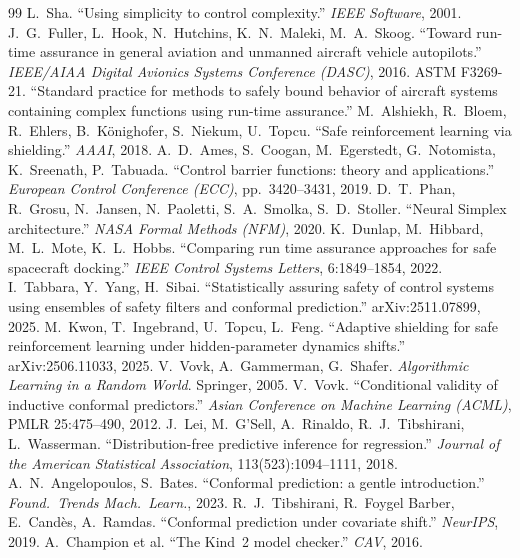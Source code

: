 \documentclass[journal]{IEEEtran}
\theoremstyle{plain}
\theoremstyle{definition}
\begin{document}
\begin{thebibliography}{99}\small
{} L.~Sha. ``Using simplicity to control complexity.'' \emph{IEEE Software}, 2001.
 J.~G.~Fuller, L.~Hook, N.~Hutchins, K.~N.~Maleki, M.~A.~Skoog. ``Toward run-time assurance in general aviation and unmanned aircraft vehicle autopilots.'' \emph{IEEE/AIAA Digital Avionics Systems Conference (DASC)}, 2016.
 ASTM F3269-21. ``Standard practice for methods to safely bound behavior of aircraft systems containing complex functions using run-time assurance.''
 M.~Alshiekh, R.~Bloem, R.~Ehlers, B.~K\"onighofer, S.~Niekum, U.~Topcu. ``Safe reinforcement learning via shielding.'' \emph{AAAI}, 2018.
 A.~D.~Ames, S.~Coogan, M.~Egerstedt, G.~Notomista, K.~Sreenath, P.~Tabuada. ``Control barrier functions: theory and applications.'' \emph{European Control Conference (ECC)}, pp.\ 3420--3431, 2019.
 D.~T.~Phan, R.~Grosu, N.~Jansen, N.~Paoletti, S.~A.~Smolka, S.~D.~Stoller. ``Neural Simplex architecture.'' \emph{NASA Formal Methods (NFM)}, 2020.
 K.~Dunlap, M.~Hibbard, M.~L.~Mote, K.~L.~Hobbs. ``Comparing run time assurance approaches for safe spacecraft docking.'' \emph{IEEE Control Systems Letters}, 6:1849--1854, 2022.
 I.~Tabbara, Y.~Yang, H.~Sibai. ``Statistically assuring safety of control systems using ensembles of safety filters and conformal prediction.'' arXiv:2511.07899, 2025.
 M.~Kwon, T.~Ingebrand, U.~Topcu, L.~Feng. ``Adaptive shielding for safe reinforcement learning under hidden-parameter dynamics shifts.'' arXiv:2506.11033, 2025.
 V.~Vovk, A.~Gammerman, G.~Shafer. \emph{Algorithmic Learning in a Random World}. Springer, 2005.
 V.~Vovk. ``Conditional validity of inductive conformal predictors.'' \emph{Asian Conference on Machine Learning (ACML)}, PMLR 25:475--490, 2012.
 J.~Lei, M.~G'Sell, A.~Rinaldo, R.~J.~Tibshirani, L.~Wasserman. ``Distribution-free predictive inference for regression.'' \emph{Journal of the American Statistical Association}, 113(523):1094--1111, 2018.
 A.~N.~Angelopoulos, S.~Bates. ``Conformal prediction: a gentle introduction.'' \emph{Found.\ Trends Mach.\ Learn.}, 2023.
 R.~J.~Tibshirani, R.~Foygel Barber, E.~Cand\`es, A.~Ramdas. ``Conformal prediction under covariate shift.'' \emph{NeurIPS}, 2019.
 A.~Champion et al. ``The Kind~2 model checker.'' \emph{CAV}, 2016.
\end{thebibliography}
\end{document}
